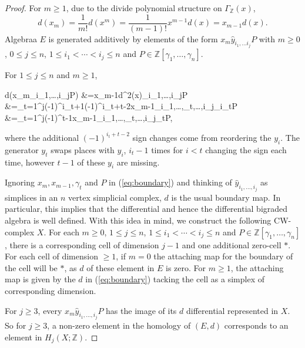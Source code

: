 \documentclass{article}
\theoremstyle{plain}
\theoremstyle{definition}
\numberwithin{thm}{section}
\begin{document}
			\begin{proof}
					For $m\geq 1$, due to the divide polynomial structure on $\Gamma_{\mathbb{Z}}(x)$,
					\begin{equation}\label{eq:difdiv}
							d(x_m)=\frac{1}{m!}d(x^m)= \frac{1}{(m-1)!} x^{m-1} d(x)= x_{m-1}d(x).
					\end{equation}
					Algebraa $E$ is generated additively by elements of the form $x_m\hat{y}_{i_1,\dots i_j}P$
					with $m\geq 0$, $0\leq j \leq n$, $1\leq i_1<\cdots<i_j\leq n$ and $P\in \mathbb{Z}[\gamma_1,\dots,\gamma_n]$.
					
					For $1\leq j \leq n$ and $m\geq 1$,
					\begin{flalign}\label{eq:boundary}
						\begin{split}
								d(x_m_{i_1,\dots,i_j}P)
								&=x_{m-1}d^2(x)_{i_1,\dots,i_j}P \\
								&=\sum_{t=1}^j{(-1)^{i_t+1}(-1)^{i_t+t-2}x_{m-1}_{i_1,\dots,_t,\dots,i_j}\gamma_{i_t}P} \\
								&=\sum_{t=1}^j{(-1)^{t-1}x_{m-1}_{i_1,\dots,_t,\dots,i_j}\gamma_tP},
						\end{split}
					\end{flalign}
					where the additional $(-1)^{i_t+t-2}$ sign changes come from reordering the $y_i$.
					The generator $y_t$ swaps places with $y_i$, $i_t-1$ times for $i<t$ changing the sign each time,
					however $t-1$ of these $y_i$ are missing.
					
					Ignoring $x_m,x_{m-1},\gamma_t$ and $P$ in (\ref{eq:boundary})
					and thinking of $\hat{y}_{i_1,\dots,i_j}$ as simplices in an $n$ vertex simplicial complex, $d$ is the usual boundary map.
					In particular, this implies that the differential and hence the differential bigraded algebra is well defined. 
					With this idea in mind, we construct the following CW-complex $X$.
					For each $m\geq 0$, $1\leq j \leq n$, $1\leq i_1<\cdots<i_j\leq n$ and $P\in \mathbb{Z}[\gamma_1,\dots,\gamma_n]$, there is a corresponding cell of dimension $j-1$
					and one additional zero-cell $*$.
					For each cell of dimension $\geq 1$, if $m=0$ the attaching map for the boundary of the cell will be $*$, as $d$ of these element in $E$ is zero.
					For $m\geq 1$, the attaching map is given by the $d$ in (\ref{eq:boundary}) tacking the cell as a simplex of corresponding dimension.
					
					For $j\geq3$, every $x_m\hat{y}_{i_1,\dots,i_j}P$ has the image of its $d$ differential represented in $X$.
					So for $j\geq3$, a non-zero element in the homology of $(E,d)$ corresponds to an element in  $H_j(X;\mathbb{Z})$. 
					

\end{proof}
\end{document}
